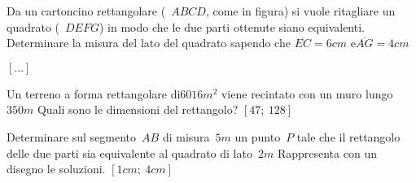 \begin{multicols}{2}
\begin{comment}
\begin{esercizio}[\Ast]
 \label{ese:3.132}
Un capitale di 12000 euro è depositato in banca a un certo tasso di 
interesse
annuale. Alla scadenza del primo anno gli interessi maturati vengono
ridepositati sullo stesso conto. Alla scadenza del secondo anno si ritira 
la
somma di 12854,70 euro. Qual è stato il tasso di interesse?
\hfill\(\left[3,5\%\right]\)
\end{esercizio}

\begin{esercizio}
 \label{ese:3.133}
In un rettangolo, se si aumenta di 2 metri la base e si riduce di un metro
l'altezza, la sua area aumenta di 4 metri quadrati. Se invece si riduce di
un metro la base e si aumenta di 2 metri l'altezza, l'area aumenta di 22
metri quadrati. Quali sono le dimensioni del rettangolo?
\hfill\(\left[...\right]\)
\end{esercizio}

\begin{esercizio}[\Ast]
 \label{ese:3.134}
Una ditta spende mensilmente 73500 in stipendi per i propri dipendenti.
Aumentando di 5 il numero dei dipendenti, ma riducendo l'orario di lavoro,
diminuisce a ciascuno lo stipendio di 200 e spende solamente 2500 in più 
per
gli stipendi. Quanti dipendenti aveva inizialmente la ditta e quanto
guadagnava ognuno di essi?
\hfill\(\left[35;~2100\right]\)
\end{esercizio}

\end{comment}

\begin{esercizio}[\Ast]
 \label{ese:3.135}
Da un cartoncino rettangolare (~\(ABCD\), come in figura) si vuole 
ritagliare 
un
quadrato (~\(DEFG\)) in modo che le due parti ottenute siano equivalenti.
Determinare la misura del lato del quadrato sapendo che
\(\overline {EC} = 6\unit{cm}\) e\(\overline {AG} = 4\unit{cm}\)
\begin{center}
 
\end{center}
\hfill\(\left[...\right]\)
\end{esercizio}

\begin{esercizio}[\Ast]
 \label{ese:3.136}
Un terreno a forma rettangolare di\(6016\unit{m^2}\) viene recintato con un 
muro 
lungo~\(350\unit{m}\) Quali sono le dimensioni del rettangolo?
\hfill\(\left[47;~128\right]\)
\end{esercizio}

\begin{esercizio}[\Ast]
 \label{ese:3.137}
Determinare sul segmento~\(AB\) di misura~\(5\unit{m}\) un punto~\(P\) tale 
che 
il rettangolo delle due parti sia equivalente al quadrato di 
lato~\(2\unit{m}\) Rappresenta con un disegno le soluzioni.
\hfill\(\left[1\unit{cm};~4\unit{cm}\right]\)
\end{esercizio}


\end{multicols}
